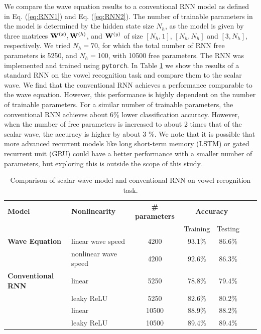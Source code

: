 We compare the wave equation results to a conventional RNN model as defined in Eq. (\ref{eq:RNN1}) and Eq. (\ref{eq:RNN2}). 
The number of trainable parameters in the model is determined by the hidden state size $N_h$, as the model is given by three matrices $\mathbf{W}^{(x)}, \mathbf{W}^{(h)}$, and $\mathbf{W}^{(y)}$ of size $[N_h, 1]$, $[N_h, N_h]$ and $[3, N_h]$, respectively. 
We tried $N_h = $70, for which the total number of RNN free parameters is 5250, and $N_h=$100, with 10500 free parameters. 
The RNN was implemented and trained using \texttt{pytorch}.  
In Table \ref{tab:final_table} we show the results of a standard RNN on the vowel recognition task and compare them to the scalar wave.  
We find that the conventional RNN achieves a performance comparable to the wave equation.
However, this performance is highly dependent on the number of trainable parameters.  
For a similar number of trainable parameters, the conventional RNN achieves about 6\% lower classification accuracy.  
However, when the number of free parameters is increased to about 2 times that of the scalar wave, the accuracy is higher by about 3 \%. 
We note that it is possible that more advanced recurrent models like long short-term memory (LSTM) \cite{hochreiter1997long} or gated recurrent unit (GRU) \cite{chung2014empirical} could have a better performance with a smaller number of parameters, but exploring this is outside the scope of this study. 

\begin{table}[t]
    \centering
    \setlength{\tabcolsep}{6pt}
    \renewcommand{\arraystretch}{1.25}
    \begin{tabular}{llccccc}
        \hline\hline
        \textbf{Model} & \textbf{Nonlinearity} & \textbf{\# parameters} & \multicolumn{2}{c}{\textbf{Accuracy}} \\
        & & & Training & Testing \\
        \hline
        \textbf{Wave Equation} & linear wave speed & 4200 & 93.1\% & 86.6\% \\
          & nonlinear wave speed & 4200 & 92.6\% & 86.3\% \\
        \hline
        \textbf{Conventional RNN} & linear & 5250 & 78.8\% & 79.4\% \\
        & leaky ReLU & 5250 & 82.6\% & 80.2\% \\
        & linear & 10500  & 88.9\% & 88.2\% \\
        & leaky ReLU     & 10500 & 89.4\% & 89.4\% \\
        \hline\hline
    \end{tabular}
    \caption{Comparison of scalar wave model and conventional RNN on vowel recognition task.}
    \label{tab:final_table}
\end{table}

